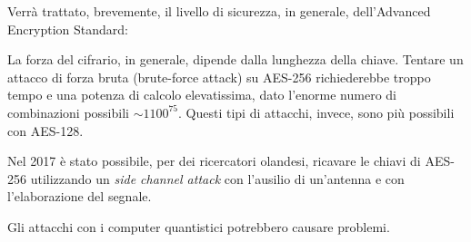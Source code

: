   

\textsf{\small Verrà trattato, brevemente, il livello di sicurezza, in generale, dell'Advanced Encryption Standard:}

 

\textsf{\small La forza del cifrario, in generale, dipende dalla lunghezza della chiave. Tentare un attacco di forza bruta (brute-force attack) su AES-256 richiederebbe troppo tempo e una potenza di calcolo elevatissima, dato l'enorme numero di combinazioni possibili $ \sim 1100^{75} $. Questi tipi di attacchi, invece, sono più possibili con AES-128.}

 

\textsf{\small Nel 2017 è stato possibile, per dei ricercatori olandesi, ricavare le chiavi di AES-256 utilizzando un \emph{side channel attack} con l'ausilio di un'antenna e con l'elaborazione del segnale.}

\textsf{\small Gli attacchi con i computer quantistici potrebbero causare problemi.}

